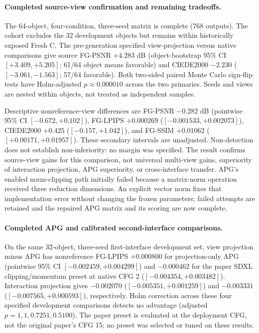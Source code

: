 \documentclass[11pt]{article}
\begin{document}
\paragraph{Completed source-view confirmation and remaining tradeoffs.}
The 64-object, four-condition, three-seed matrix is complete (768 outputs).
The cohort excludes the 32 development objects but remains within historically
exposed Fresh C. The pre-generation specified view-projection versus native
comparisons give source FG-PSNR $+4.283$ dB (object-bootstrap 95\% CI
$[+3.409,+5.205]$; 61/64 object means favorable) and CIEDE2000 $-2.230$
($[-3.061,-1.563]$; 57/64 favorable). Both two-sided paired Monte Carlo
sign-flip tests have Holm-adjusted $p\approx 0.000010$ across the two primaries.
Seeds and views are nested within objects, not treated as independent samples.

Descriptive nonreference-view differences are FG-PSNR $-0.282$ dB
(pointwise 95\% CI $[-0.672,\allowbreak +0.102]$), FG-LPIPS $+0.000269$
($[-0.001533,\allowbreak +0.002073]$), CIEDE2000 $+0.425$
($[-0.157,\allowbreak +1.042]$), and FG-SSIM $+0.01062$
($[+0.00171,\allowbreak +0.01957]$). These secondary intervals are unadjusted.
Non-detection does not establish non-inferiority: no margin was specified.
The result confirms source-view gains for this comparison, not universal
multi-view gains, superiority of interaction projection, APG superiority,
or cross-interface transfer. APG's enabled norm-clipping path initially
failed because a matrix-norm operation received three reduction dimensions.
An explicit vector norm fixes that implementation error without changing the
frozen parameters; failed attempts are retained and the repaired APG matrix
and its scoring are now complete.

\paragraph{Completed APG and calibrated second-interface comparisons.}
On the same 32-object, three-seed first-interface development set, view
projection minus APG has nonreference FG-LPIPS $+0.000800$ for projection-only
APG (pointwise 95\% CI $[-0.002459,+0.004299]$) and $-0.000462$ for the
paper SDXL clipping/momentum preset at native CFG 2
($[-0.004354,+0.003482]$). Interaction projection gives $-0.002070$
($[-0.005351,+0.001259]$) and $-0.003331$
($[-0.007565,+0.000593]$), respectively. Holm correction across these four
specified development comparisons detects no advantage (adjusted
$p=1,1,0.7251,0.5100$). The paper preset is evaluated at the deployment CFG,
not the original paper's CFG 15; no preset was selected or tuned on these results.
\end{document}
